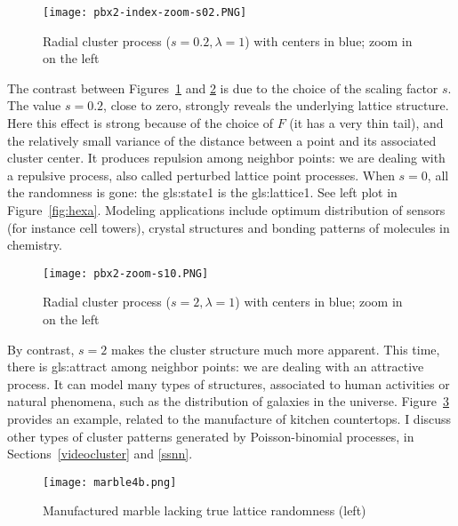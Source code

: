 \documentclass[10pt]{article}
\begin{document}
 
\begin{figure}[H]
\centering
\texttt{[image: pbx2-index-zoom-s02.PNG]}
\caption{Radial cluster process ($s=0.2, \lambda=1$) with centers in blue; zoom in on the left}
\label{fig:pbr4b}
\end{figure}

The contrast between Figures~\ref{fig:pbr4b} and \ref{fig:pbr} is due to the choice of the scaling factor $s$. The value $s=0.2$, close to zero,  strongly reveals the underlying lattice structure. Here this effect is strong because of  the choice of $F$ (it has a very thin tail), and the relatively small variance of the distance between a point and its associated cluster center.
It produces repulsion among neighbor points: we are dealing with a 
\textcolor{index}{repulsive process}, also called \textcolor{index}{perturbed lattice point processes}. When $s=0$,  all the randomness
is gone: the \gls{gls:state1} is the \gls{gls:lattice1}. See left plot in Figure~\ref{fig:hexa}.  Modeling applications include 
optimum distribution of sensors (for instance cell towers), crystal structures and bonding patterns of molecules in chemistry.


\begin{figure}[H]
\centering
\texttt{[image: pbx2-zoom-s10.PNG]} 
\caption{Radial cluster process ($s=2, \lambda=1$) with centers in blue; zoom in on the left}
\label{fig:pbr}
\end{figure}

By contrast, $s=2$ makes the cluster structure much more apparent. This time, there is \gls{gls:attract} among neighbor points: we are dealing with an
\textcolor{index}{attractive process}. It can model many types of structures, associated to human activities or natural phenomena, such 
as the distribution of galaxies in the universe. Figure~\ref{fig:quartz} provides an example, related to the manufacture of kitchen countertops. I discuss other types of
cluster patterns generated by Poisson-binomial processes, in Sections~\ref{videocluster} and \ref{ssnn}. 


\begin{figure}[H]
\centering
\texttt{[image: marble4b.png]} 
\caption{Manufactured marble lacking true lattice randomness (left)}
\label{fig:quartz}
\end{figure}
\end{document}
